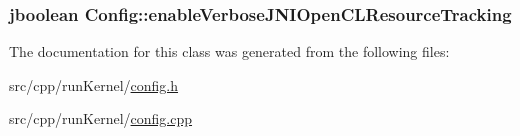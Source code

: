 \hypertarget{class_config_a40e02509e9330fa8d16087e7dde8a977}{
\subsubsection[{enable\-Verbose\-J\-N\-I\-Open\-C\-L\-Resource\-Tracking}]{\setlength{\rightskip}{0pt plus 5cm}jboolean Config\-::enable\-Verbose\-J\-N\-I\-Open\-C\-L\-Resource\-Tracking}}\label{class_config_a40e02509e9330fa8d16087e7dde8a977}


The documentation for this class was generated from the following files\-:\begin{DoxyCompactItemize}
\item 
src/cpp/run\-Kernel/\hyperlink{config_8h}{config.\-h}\item 
src/cpp/run\-Kernel/\hyperlink{config_8cpp}{config.\-cpp}\end{DoxyCompactItemize}
